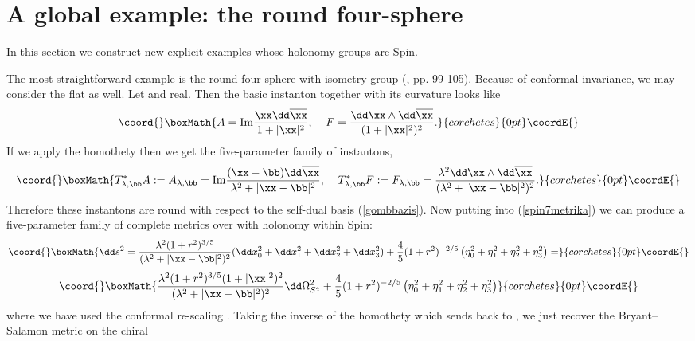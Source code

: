 \documentclass[a4paper,12pt,draft]{article}
\begin{document}
\section{A global example: the round four-sphere}

In this section we construct new explicit examples whose holonomy
groups are Spin\coordHE{}. 

The most straightforward example is the round four-sphere
\coordHE{} with isometry group \coordHE{} (\cite{fre-uhl},
pp. 99-105). Because of conformal invariance,
we may consider the flat \myHighlight{$\R^4\cong\HH$}\coordHE{} as well. Let \myHighlight{$\xx
,\bb\in\HH$}\coordHE{} and \coordHE{} real. Then the basic instanton together
with its curvature looks like
\[\coord{}\boxMath{A = {\rm Im}{\xx\dd\overline{\xx }\over 1+|\xx
|^2},\:\:\:\:\:F={\dd\xx\wedge\dd\overline{\xx}\over
(1+\vert\xx\vert^2)^2}.}{corchetes}{0pt}\coordE{}\] 
If we apply the homothety \coordHE{} then we get the five-parameter family of instantons,
\[\coord{}\boxMath{T^*_{\lambda ,\bb}A:=A_{\lambda , \bb }={\rm Im}{(\xx
-\bb)\dd\overline\xx \over 
\lambda^2+\vert\xx -\bb\vert^2}, \:\:\:\:\:T^*_{\lambda ,\bb}F:=F_{\lambda
,\bb}= {\lambda^2\dd\xx\wedge\dd\overline{\xx}\over
(\lambda^2+\vert\xx -\bb\vert^2)^2}.}{corchetes}{0pt}\coordE{}\]
Therefore these instantons are round with respect to the self-dual basis
(\ref{gombbazis}). Now putting \coordHE{} into
(\ref{spin7metrika}) we can produce a five-parameter family of complete
metrics \coordHE{} over \coordHE{} with holonomy within Spin\coordHE{}: 
\[\coord{}\boxMath{\dd s^2= {\lambda^2(1+r^2)^{3/5}\over (\lambda^2+\vert\xx
-\bb\vert^2)^2}(\dd x_0^2+\dd x_1^2+\dd x_2^2+\dd x_3^2)+
{4\over 5}(1+r^2)^{-2/5}\left(\eta_0^2 +\eta_1^2 +\eta_2^2
+\eta_3^2\right) =}{corchetes}{0pt}\coordE{}\]
\[\coord{}\boxMath{ {\lambda^2(1+r^2)^{3/5}(1+|\xx |^2)^2\over (\lambda^2+\vert\xx
-\bb\vert^2)^2}\dd\Omega^2_{S^4}+{4\over 5}(1+r^2)^{-2/5}\left(\eta_0^2
+\eta_1^2 +\eta_2^2 +\eta_3^2\right) }{corchetes}{0pt}\coordE{}\]
where we have used the conformal re-scaling \coordHE{}. Taking the
inverse of the homothety \coordHE{} which sends \coordHE{}
back to \coordHE{}, we just recover the Bryant--Salamon metric on the chiral
\end{document}

